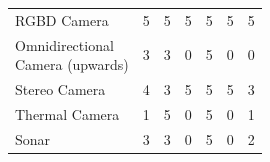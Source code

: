 \documentclass[12pt]{extarticle}
\begin{document}
\begin{table}[H]
\begin{adjustwidth}{-1.5in}{-1.5in}
\begin{tabular}{lcccccc}
		\multicolumn{1}{l}{\cellcolor{badhighlight!70}RGBD Camera }& \multicolumn{1}{c}{\cellcolor{badhighlight!70}5} & \multicolumn{1}{c}{\cellcolor{badhighlight!70}5 } & \multicolumn{1}{c}{\cellcolor{badhighlight!70}5 } & \multicolumn{1}{c}{\cellcolor{badhighlight!70}5 }   & \multicolumn{1}{c}{\cellcolor{badhighlight!70}5 } & \multicolumn{1}{c}{\cellcolor{badhighlight!70}5 } \\ \hdashline
		\makecell[l]{Omnidirectional \\ Camera (upwards)}            & 3                         & 3                          & 0                       & 5                              & 0                        & 0                    \\ \hdashline
		Stereo Camera                                                & 4                         & 3                          & 5                       & 5                              & 5                        & 3                    \\ \hdashline
		Thermal Camera                                               & 1                         & 5                          & 0                       & 5                              & 0                        & 1                    \\ \hdashline
		Sonar                                                        & 3                         & 3                          & 0                       & 5                              & 0                        & 2                   \\ 		
		\end{tabular}

		\end{adjustwidth}
		\end{table}
		
\end{document}
